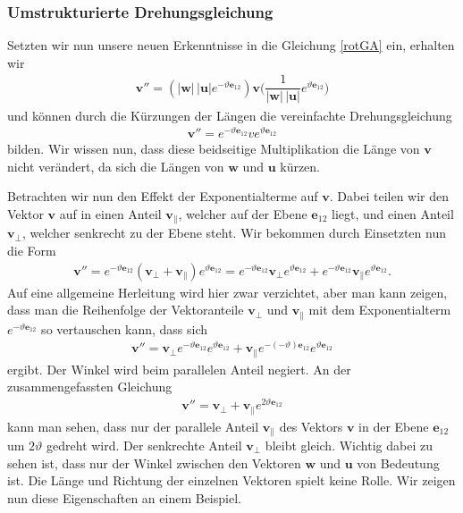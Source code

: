 \subsubsection{Umstrukturierte Drehungsgleichung}
Setzten wir nun unsere neuen Erkenntnisse in die Gleichung \eqref{rotGA} ein, erhalten wir
\begin{align*}
\mathbf{v''}
=
(|\mathbf{w}|\,|\mathbf{u}|e^{-\vartheta \mathbf{e}_{12}})\mathbf{v}\biggl(\dfrac{1}{|\mathbf{w}|\,|\mathbf{u}|}e^{\vartheta \mathbf{e}_{12}}\biggr)
\end{align*}
und können durch die Kürzungen der Längen die vereinfachte Drehungsgleichung
\begin{align} \label{GAvereinfRot}
\mathbf{v''} = e^{-\vartheta \mathbf{e}_{12}} v e^{\vartheta \mathbf{e}_{12}}
\end{align}
bilden.
Wir wissen nun, dass diese beidseitige Multiplikation die Länge von $\mathbf{v}$ nicht verändert, da sich die Längen von $\mathbf{w}$ und $\mathbf{u}$ kürzen.

Betrachten wir nun den Effekt der Exponentialterme auf $\mathbf{v}$. Dabei teilen wir den Vektor $\mathbf{v}$ auf in einen Anteil $\mathbf{v_\parallel}$, welcher auf der Ebene $\mathbf{e}_{12}$ liegt, und einen Anteil $\mathbf{v_\perp}$, welcher senkrecht zu der Ebene steht. Wir bekommen durch Einsetzten nun die Form
\begin{align} \label{RotAufPerpPar}
\mathbf{v}'' = e^{-\vartheta \mathbf{e}_{12}} (\mathbf{v_\perp + v_\parallel}) e^{\vartheta \mathbf{e}_{12}} = e^{-\vartheta \mathbf{e}_{12}} \mathbf{v_\perp} e^{\vartheta \mathbf{e}_{12}} + e^{-\vartheta \mathbf{e}_{12}} \mathbf{v_\parallel} e^{\vartheta \mathbf{e}_{12}}.
\end{align}
Auf eine allgemeine Herleitung wird hier zwar verzichtet, aber man kann zeigen, dass man die Reihenfolge der Vektoranteile $\mathbf{v_\perp}$ und $\mathbf{v_\parallel}$ mit dem Exponentialterm $e^{-\vartheta \mathbf{e}_{12}}$ so vertauschen kann, dass sich 
\begin{align*}
\mathbf{v}'' = \mathbf{v_\perp} e^{-\vartheta \mathbf{e}_{12}}  e^{\vartheta \mathbf{e}_{12}} +  \mathbf{v_\parallel} e^{-(-\vartheta) \mathbf{e}_{12}} e^{\vartheta \mathbf{e}_{12}}
\end{align*}
ergibt. Der Winkel wird beim parallelen Anteil negiert. An der zusammengefassten Gleichung
\begin{align}\label{RotParPerp}
\mathbf{v}'' = \mathbf{v_\perp} +  \mathbf{v_\parallel} e^{2\vartheta \mathbf{e}_{12}}
\end{align}
kann man sehen, dass nur der parallele Anteil $\mathbf{v_\parallel}$ des Vektors $\mathbf{v}$ in der Ebene $\mathbf{e}_{12}$ um $2\vartheta$ gedreht wird.
Der senkrechte Anteil $\mathbf{v_\perp}$ bleibt gleich.
Wichtig dabei zu sehen ist, dass nur der Winkel zwischen den Vektoren $\mathbf{w}$ und $\mathbf{u}$ von Bedeutung ist.
Die Länge und Richtung der einzelnen Vektoren spielt keine Rolle.
Wir zeigen nun diese Eigenschaften an einem Beispiel.

